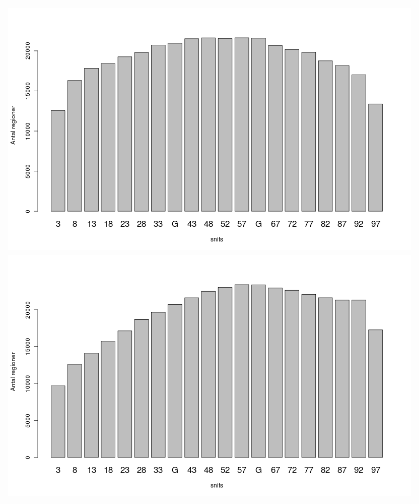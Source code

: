 \documentclass[xcolor=table]{beamer}
\begin{document}
\begin{frame}
{\begin{columns}[t]
        \centering
        \begin{block}{}
            \centering
            \includegraphics[width=0.80\textwidth]{billeder/cut0cut1eatsperrationNoBug}\\
            \includegraphics[width=0.80\textwidth]{billeder/cut2cut3eatsperrationNoBug}
        \end{block}

    \end{columns}
    }





\end{frame}
\end{document}
